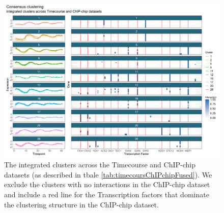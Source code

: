 \documentclass[]{article}
\begin{document}
\begin{figure}
	\centering
	\includegraphics[scale=0.6]{./Images/Yeast/timecourseChIPchipFused.png}
	\caption{The integrated clusters across the Timecourse and ChIP-chip datasets (as described in tbale \ref{tab:timecoursChIPchipFused}). We exclude the clusters with no interactions in the ChIP-chip dataset and include a red line for the Transcription factors that dominate the clustering structure in the ChIP-chip dataset.}
	\label{fig:timepointChIPchipFused}
\end{figure}

\end{document}
